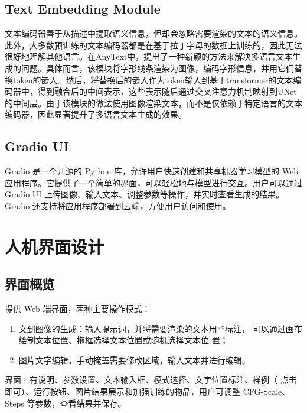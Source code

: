 \documentclass[a4paper,12pt]{ctexart}  %
\begin{document}
\subsection{Text Embedding Module}
文本编码器善于从描述中提取语义信息，但却会忽略需要渲染的文本的语义信息。此外，大多数预训练的文本编码器都是在基于拉丁字母的数据上训练的，因此无法很好地理解其他语言。在AnyText中，提出了一种新颖的方法来解决多语言文本生成的问题。具体而言，该模块将字形线条渲染为图像，编码字形信息，并用它们替换token的嵌入。然后，将替换后的嵌入作为token输入到基于transformer的文本编码器中，得到融合后的中间表示，这些表示随后通过交叉注意力机制映射到UNet的中间层。由于该模块的做法使用图像渲染文本，而不是仅依赖于特定语言的文本编码器，因此显著提升了多语言文本生成的效果。
\subsection{Gradio UI}
Gradio 是一个开源的 Python 库，允许用户快速创建和共享机器学习模型的 Web 应用程序。它提供了一个简单的界面，可以轻松地与模型进行交互。用户可以通过 Gradio UI 上传图像、输入文本、调整参数等操作，并实时查看生成的结果。Gradio 还支持将应用程序部署到云端，方便用户访问和使用。
\section{人机界面设计}
\subsection{界面概览}
提供 Web 端界面，两种主要操作模式：
\begin{enumerate}
    \item 文到图像的生成：输入提示词，并将需要渲染的文本用“”标注，
    可以通过画布绘制文本位置、拖框选择文本位置或随机选择文本位
    置；
    \item 图片文字编辑，手动掩盖需要修改区域，输入文本并进行编辑。

\end{enumerate}

界面上有说明、参数设置、文本输入框、模式选择、文字位置标注、样例（
点击即可）、运行按钮、图片结果展示和加强训练的物品，用户可调整 CFG-Scale、Steps 等参数，查看结果并保存。
\end{document}
